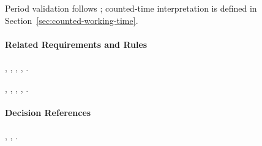Period validation follows ; counted-time interpretation is defined in Section~\ref{sec:counted-working-time}.

\paragraph{Related Requirements and Rules}
\hyperref[fr:024]{}, \hyperref[fr:025]{}, \hyperref[fr:026]{}, \hyperref[fr:027]{}, \hyperref[fr:029]{}.

\hyperref[br:015]{}, \hyperref[br:016]{}, \hyperref[br:017]{}, \hyperref[br:019]{}, \hyperref[br:021]{}.

\paragraph{Decision References}
, , .

